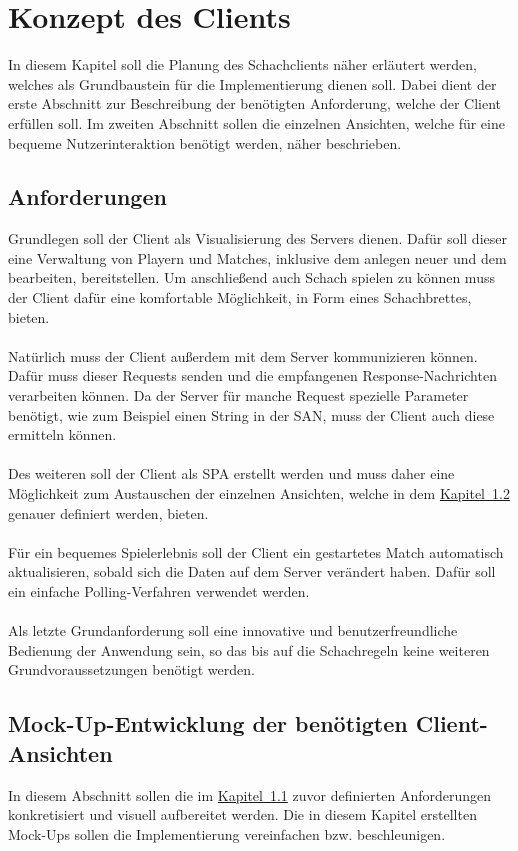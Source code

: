 
\chapter{Konzept des Clients}
In diesem Kapitel soll die Planung des Schachclients näher erläutert werden, welches als Grundbaustein für die Implementierung dienen soll. Dabei dient der erste Abschnitt zur Beschreibung der benötigten Anforderung, welche der Client erfüllen soll. Im zweiten Abschnitt sollen die einzelnen Ansichten, welche für eine bequeme Nutzerinteraktion benötigt werden, näher beschrieben. 

\section{Anforderungen}\label{sec:anforderungenClient}
Grundlegen soll der Client als Visualisierung des Servers dienen. Dafür soll dieser eine Verwaltung von Playern und Matches, inklusive dem anlegen neuer und dem bearbeiten, bereitstellen. Um anschließend auch Schach spielen zu können muss der Client dafür eine komfortable Möglichkeit, in Form eines Schachbrettes, bieten.\\
\\
Natürlich muss der Client außerdem mit dem Server kommunizieren können. Dafür muss dieser Requests senden und die empfangenen Response-Nachrichten verarbeiten können. Da der Server für manche Request spezielle Parameter benötigt, wie zum Beispiel einen String in der \gls{SAN}, muss der Client auch diese ermitteln können.\\
\\
Des weiteren soll der Client als \gls{SPA} erstellt werden und muss daher eine Möglichkeit zum Austauschen der einzelnen Ansichten, welche in dem \hyperref[sec:views]{Kapitel~\ref{sec:views}} genauer definiert werden, bieten.\\
\\
Für ein bequemes Spielerlebnis soll der Client ein gestartetes Match automatisch aktualisieren, sobald sich die Daten auf dem Server verändert haben. Dafür soll ein einfache Polling-Verfahren verwendet werden.\\
\\ 
Als letzte Grundanforderung soll eine innovative und benutzerfreundliche Bedienung der Anwendung sein, so das bis auf die Schachregeln keine weiteren Grundvoraussetzungen benötigt werden.

\section{Mock-Up-Entwicklung der benötigten Client-Ansichten}\label{sec:views}
In diesem Abschnitt sollen die im \hyperref[sec:anforderungenClient]{Kapitel~\ref{sec:anforderungenClient}} zuvor definierten Anforderungen konkretisiert und visuell aufbereitet werden. Die in diesem Kapitel erstellten Mock-Ups sollen die Implementierung vereinfachen bzw. beschleunigen.

